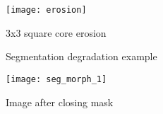 \begin{figure}[h]
    \centering
    \texttt{[image: erosion]}
    \caption{3x3 square core erosion}
    \label{fig:erosion}
\end{figure}

\begin{figure}[h]
	\centering
    \qquad
    \caption{Segmentation degradation example}%
    \label{fig_7_1}
\end{figure}



\begin{figure}[h]
    \centering
    \texttt{[image: seg\_morph\_1]}
    \caption{Image after closing mask}
    \label{fig:seg_morph_1}
\end{figure}
